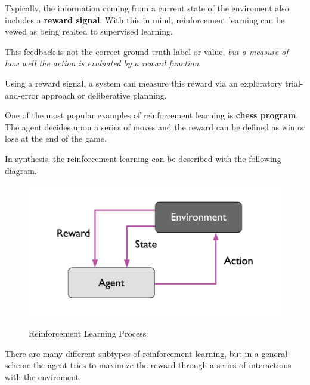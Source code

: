 \documentclass[../machine_learning_scikit.tex]{subfiles}
\begin{document}
    \begin{obs}
        Typically, the information coming from a current state of the enviroment also includes a \textbf{reward signal}. With this in mind, reinforcement learning can be vewed as being realted to supervised learning.

        This feedback is not the correct ground-truth label or value, \textit{but a measure of how well the action is evaluated by a reward function}.
    \end{obs}

    Using a reward signal, a system can measure this reward via an exploratory trial-and-error approach or deliberative planning.

    \begin{exa}
        One of the most popular examples of reinforcement learning is \textbf{chess program}. The agent decides upon a series of moves and the reward can be defined as win or lose at the end of the game.
    \end{exa}

    In synthesis, the reinforcement learning can be described with the following diagram.

    \begin{figure}[h]
        \begin{minipage}{\textwidth}
            \centering
            \includegraphics[scale=1]{images/_e4ebbd4.png} \\
            \caption{Reinforcement Learning Process}
            \label{figure:reinforcement_learning_process}
        \end{minipage}
    \end{figure}

    There are many different subtypes of reinforcement learning, but in a general scheme the agent tries to maximize the reward through a series of interactions with the enviroment.
    
\end{document}
